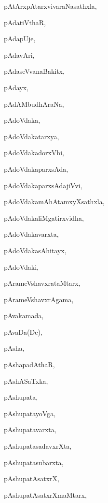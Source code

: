 \begin{multicols}{2}
{pAtArxpAtarxvivaraNasathxla}, \pageref{pAtArxpAtarxvivaraNasathxla}

{pAdatiVthaR}, \pageref{pAdatiVthaR}

{pAdapUje}, \pageref{pAdapUje}

{pAdavAri}, \pageref{pAdavAri}

{pAdaseVvanaBakitx}, \pageref{pAdaseVvanaBakitx}

{pAdayx}, \pageref{pAdayx}

{pAdAMbudhAraNa}, \pageref{pAdAMbudhAraNa}

{pAdoVdaka}, \pageref{pAdoVdaka}

{pAdoVdakatarxya}, \pageref{pAdoVdakatarxya}

{pAdoVdakadorxVhi}, \pageref{pAdoVdakadorxVhi}

{pAdoVdakaparxsAda}, \pageref{pAdoVdakaparxsAda}

{pAdoVdakaparxsAdajiVvi}, \pageref{pAdoVdakaparxsAdajiVvi}

{pAdoVdakamAhAtamxyXsathxla}, \pageref{pAdoVdakamAhAtamxyXsathxla}

{pAdoVdakaliMgatirxvidha}, \pageref{pAdoVdakaliMgatirxvidha}

{pAdoVdakavarxta}, \pageref{pAdoVdakavarxta}

{pAdoVdakasAhitayx}, \pageref{pAdoVdakasAhitayx}

{pAdoVdaki}, \pageref{pAdoVdaki}

{pArameVshavxrataMtarx}, \pageref{pArameVshavxrataMtarx}

{pArameVshavxrAgama}, \pageref{pArameVshavxrAgama}

{pAvakamada}, \pageref{pAvakamada}

{pAvaDa(De)}, \pageref{pAvaDaDe}

{pAsha}, \pageref{pAsha}

{pAshapadAthaR}, \pageref{pAshapadAthaR}

{pAshASaTxka}, \pageref{pAshASaTxka}

{pAshupata}, \pageref{pAshupata}

{pAshupatayoVga}, \pageref{pAshupatayoVga}

{pAshupatavarxta}, \pageref{pAshupatavarxta}

{pAshupatasadavxrXta}, \pageref{pAshupatasadavxrXta}

{pAshupatasubarxta}, \pageref{pAshupatasubarxta}

{pAshupatAsatxrX}, \pageref{pAshupatAsatxrX}

{pAshupatAsatxrXmaMtarx}, \pageref{pAshupatAsatxrXmaMtarx}


\end{multicols}
